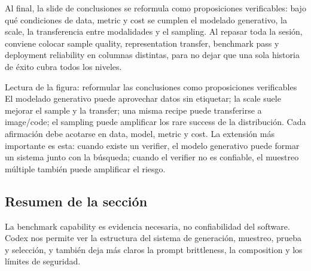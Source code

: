 Al final, la slide de conclusiones se reformula como proposiciones verificables: bajo qué condiciones de data, metric y cost se cumplen el modelado generativo, la scale, la transferencia entre modalidades y el sampling. Al repasar toda la sesión, conviene colocar sample quality, representation transfer, benchmark pass y deployment reliability en columnas distintas, para no dejar que una sola historia de éxito cubra todos los niveles.


\begin{knowledgebox}{Lectura de la figura: reformular las conclusiones como proposiciones verificables}
El modelado generativo puede aprovechar datos sin etiquetar; la scale suele mejorar el sample y la transfer; una misma recipe puede transferirse a image/code; el sampling puede amplificar los rare success de la distribución. Cada afirmación debe acotarse en data, model, metric y cost. La extensión más importante es esta: cuando existe un verifier, el modelo generativo puede formar un sistema junto con la búsqueda; cuando el verifier no es confiable, el muestreo múltiple también puede amplificar el riesgo.
\end{knowledgebox}


\subsection{Resumen de la sección}

La benchmark capability es evidencia necesaria, no confiabilidad del software. Codex nos permite ver la estructura del sistema de generación, muestreo, prueba y selección, y también deja más claros la prompt brittleness, la composition y los límites de seguridad.
